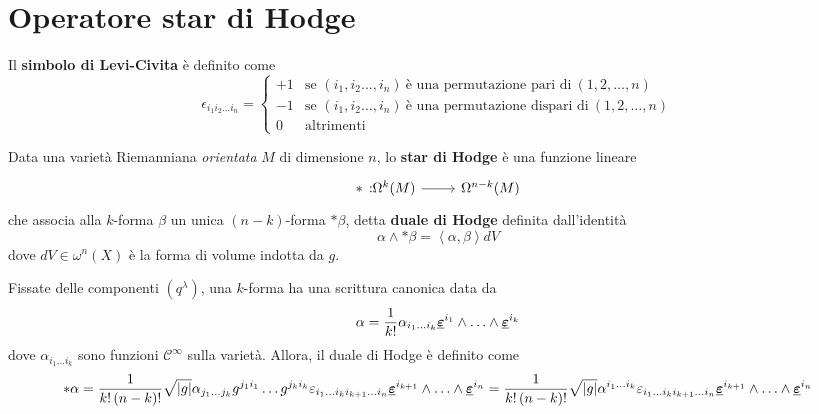 \section{Operatore star di Hodge}
\begin{define}
	Il \textbf{simbolo di Levi-Civita} è definito come
	\begin{equation}
		\epsilon_{i_1i_2\ldots i_n}=\begin{cases}
			+1&\text{se }\left(i_1,i_2\ldots,i_n\right)\ \text{è una permutazione pari di}\ (1,2,\ldots, n)\\
			-1&\text{se }\left(i_1,i_2\ldots,i_n\right)\ \text{è una permutazione dispari di}\ (1,2,\ldots, n)\\
			0&\text{altrimenti}
		\end{cases}
	\end{equation}
\end{define}
\begin{define}%
	Data una varietà Riemanniana \textit{orientata} $M$ di dimensione $n$, lo \textbf{star di Hodge} è una funzione lineare
	\begin{equation*}
		\funz[\ast]{\Omega^k(M)}{\Omega^{n-k}(M)}
	\end{equation*}
	che associa alla $k$-forma $\beta$ un unica $(n-k)$-forma $\ast\beta$, detta \textbf{duale di Hodge} definita dall'identità
	\begin{equation}%
		\alpha\wedge\ast\beta=\left<\alpha,\beta\right>dV
	\end{equation}
	dove $dV\in\omega^n(X)$ è la forma di volume indotta da $g$.
\end{define}
Fissate delle componenti $\left(q^\lambda\right)$, una $k$-forma ha una scrittura canonica data da
\begin{equation}
	\alpha=\frac{1}{k!}\alpha_{i_1\ldots i_k}\vb*{\underline{\varepsilon}}^{i_1}\wedge\ldots\wedge\vb*{\underline{\varepsilon}}^{i_k}
\end{equation}
dove $\alpha_{i_1\ldots i_k}$ sono funzioni $\mathcal{C}^{\infty}$ sulla varietà. Allora, il duale di Hodge è definito come
\begin{equation*}
\ast\alpha=\frac{1}{k!\left(n-k\right)!}\sqrt{\abs{g}}\alpha_{j_1\ldots j_k}g^{j_1i_1}\ldots g^{j_ki_k}\varepsilon_{i_1\ldots i_ki_{k+1}\ldots i_n}\vb*{\underline{\varepsilon}}^{i_{k+1}}\wedge\ldots\wedge\vb*{\underline{\varepsilon}}^{i_n}=\frac{1}{k!\left(n-k\right)!}\sqrt{\abs{g}}\alpha^{i_1\ldots i_k}\varepsilon_{i_1\ldots i_ki_{k+1}\ldots i_n}\vb*{\underline{\varepsilon}}^{i_{k+1}}\wedge\ldots\wedge\vb*{\underline{\varepsilon}}^{i_n}
\end{equation*}
